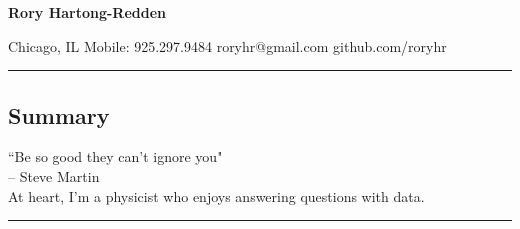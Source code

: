\documentclass[10pt,letterpaper]{article}
\begin{document}
{\raggedright 
\LARGE{\bf Rory Hartong-Redden}\\}
{\raggedleft 
Chicago, IL \textbar\/ Mobile: 925.297.9484 \textbar\/ roryhr@gmail.com \textbar\/   github.com/roryhr\\}
\hrule


\vspace{-0.4em}
\subsection*{Summary}

\begin{centering} 
``Be so good they can't ignore you" \\ -- Steve Martin  \\ \vspace{0.9em}   
At heart, I'm a physicist who enjoys answering questions with data. \\
\end{centering}

\vspace{0.4em}
	

\hrule
\vspace{-0.4em}
\end{document}
